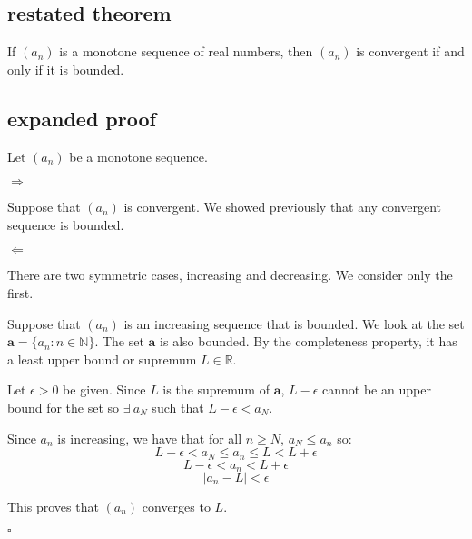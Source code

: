 \documentclass[11pt, oneside]{article}
\begin{document}
\subsection*{restated theorem}

If $(a_n)$ is a monotone sequence of real numbers, then $(a_n)$ is convergent if and only if it is bounded.

\subsection*{expanded proof}

Let $(a_n)$ be a monotone sequence.

$\Rightarrow$

Suppose that $(a_n)$ is convergent.  We showed previously that any convergent sequence is bounded.

$\Leftarrow$

There are two symmetric cases, increasing and decreasing.  We consider only the first.

Suppose that $(a_n)$ is an increasing sequence that is bounded.  We look at the set $\mathbf{a} = \{ a_n: n \in \mathbb{N} \}$.  The set $\mathbf{a}$ is also bounded.  By the completeness property, it has a least upper bound or supremum $L \in \mathbb{R}$.

Let $\epsilon > 0$ be given.  Since $L$ is the supremum of $\mathbf{a}$, $L - \epsilon$ cannot be an upper bound for the set so $\exists \ a_N$ such that $L - \epsilon < a_N$.

Since $a_n$ is increasing, we have that for all $n \ge N$, $a_N \le a_n$ so:
\[ L - \epsilon < a_N \le a_n \le L < L + \epsilon \]
\[ L - \epsilon < a_n < L + \epsilon \]
\[ |a_n - L| < \epsilon \]

This proves that $(a_n)$ converges to $L$.

$\square$
\end{document}
